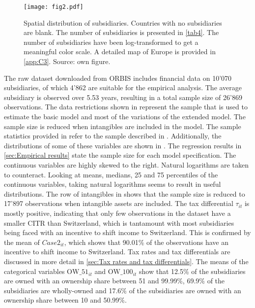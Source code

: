 \documentclass[10pt,twocolumn,oneside,cmyk]{article}
\begin{document}
\begin{figure*}
 \centering \captionsetup{width=0.95\textwidth}
  \texttt{[image: fig2.pdf]} 
 \caption[Spatial distribution of subsidiaries]{Spatial distribution of subsidiaries. Countries with no subsidiaries are blank. The number of subsidiaries is presented in \cref{tab4}. The number of subsidiaries have been log-transformed to get a meaningful color scale. A detailed map of Europe is provided in \cref{app:C3}. Source: own figure.} \label{fig2}
\end{figure*}

The raw dataset downloaded from ORBIS includes financial data on 10'070 subsidiaries, of which 4'862 are suitable for the empirical analysis. The average subsidiary is observed over 5.53 years, resulting in a total sample size of 26'869 observations. The data restrictions shown in  represent the sample that is used to estimate the basic model and most of the variations of the extended model. The sample size is reduced when intangibles are included in the model. The sample statistics provided in  refer to the sample described in . Additionally, the distributions of some of these variables are shown in . The regression results in \cref{sec:Empirical results} state the sample size for each model specification. The continuous variables are highly skewed to the right. Natural logarithms are taken to counteract. Looking at means, medians, 25 and 75 percentiles of the continuous variables, taking natural logarithms seems to result in useful distributions. The row of intangibles in  shows that the sample size is reduced to 17'897 observations when intangible assets are included. The tax differential $\tau_{it}$ is mostly positive, indicating that only few observations in the dataset have a smaller CITR than Switzerland, which is tantamount with most subsidiaries being faced with an incentive to shift income to Switzerland. This is confirmed by the mean of $Case2_{it}$, which shows that 90.01\% of the observations have an incentive to shift income to Switzerland. Tax rates and tax differentials are discussed in more detail in \cref{sec:Tax rates and tax differentials}. The means of the categorical variables $\text{OW\_51}_{it}$ and $\text{OW\_100}_{it}$ show that 12.5\% of the subsidiaries are owned with an ownership share between 51 and 99.99\%, 69.9\% of the subsidiaries are wholly-owned and 17.6\% of the subsidiaries are owned with an ownership share between 10 and 50.99\%.
\end{document}

